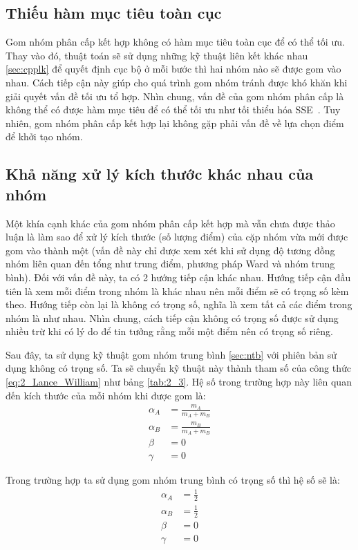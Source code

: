 \subsection{Thiếu hàm mục tiêu toàn cục}
Gom nhóm phân cấp kết hợp không có hàm mục tiêu toàn cục để có thể tối ưu.
Thay vào đó, thuật toán sẽ sử dụng những kỹ thuật liên kết khác nhau \ref{sec:cpplk} để quyết định cục bộ ở mỗi bước thì hai nhóm nào sẽ được gom vào nhau.
Cách tiếp cận này giúp cho quá trình gom nhóm tránh được khó khăn khi giải quyết vấn đề tối ưu tổ hợp.
Nhìn chung, vấn đề của gom nhóm phân cấp là không thể có được hàm mục tiêu để có thể tối ưu như tối thiểu hóa SSE~\cite{SSE}.
Tuy nhiên, gom nhóm phân cấp kết hợp lại không gặp phải vấn đề về lựa chọn điểm để khởi tạo nhóm.

\subsection{Khả năng xử lý kích thước khác nhau của nhóm}
Một khía cạnh khác của gom nhóm phân cấp kết hợp mà vẫn chưa được thảo luận là làm sao để xử lý kích thước (số lượng điểm) của cặp nhóm vừa mới được gom vào thành một (vấn đề này chỉ được xem xét khi sử dụng độ tương đồng nhóm liên quan đến tổng như trung điểm, phương pháp Ward và nhóm trung bình).
Đối với vấn đề này, ta có 2 hướng tiếp cận khác nhau.
Hướng tiếp cận đầu tiên là xem mỗi điểm trong nhóm là khác nhau nên mỗi điểm sẽ có trọng số kèm theo.
Hướng tiếp còn lại là không có trọng số, nghĩa là xem tất cả các điểm trong nhóm là như nhau.
Nhìn chung, cách tiếp cận không có trọng số được sử dụng nhiều trừ khi có lý do để tin tưởng rằng mỗi một điểm nên có trọng số riêng.

Sau đây, ta sử dụng kỹ thuật gom nhóm trung bình \ref{sec:ntb} với phiên bản sử dụng không có trọng số.
Ta sẽ chuyển kỹ thuật này thành tham số của công thức \ref{eq:2_Lance_William} như bảng \ref{tab:2_3}.
Hệ số trong trường hợp này liên quan đến kích thước của mỗi nhóm khi được gom là:
\begin{equation}
\begin{aligned}
\alpha_A &= \frac{m_A}{m_A + m_B}	\\
\alpha_B &= \frac{m_B}{m_A + m_B}	\\
\beta &= 0		\\
\gamma &= 0
\end{aligned}
\end{equation}

Trong trường hợp ta sử dụng gom nhóm trung bình có trọng số thì hệ số sẽ là:
\begin{equation}
\begin{aligned}
\alpha_A &= \frac{1}{2} \\
\alpha_B &= \frac{1}{2} \\
\beta &= 0		\\
\gamma &= 0		\\
\end{aligned}
\end{equation}

